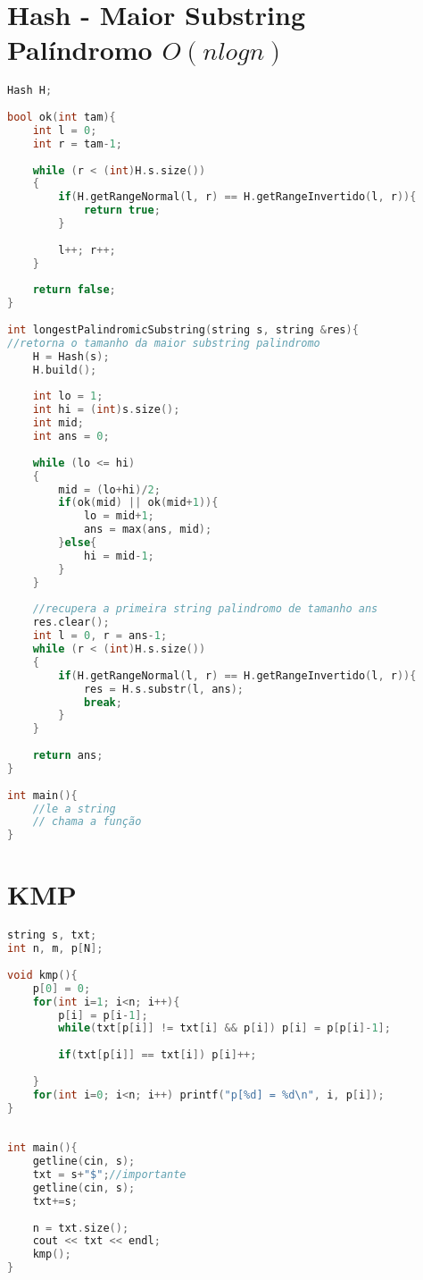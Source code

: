 \documentclass[12pt,a4paper,twoside]{report}
\begin{document}
\section{Hash - Maior Substring Palíndromo $O(nlogn)$}
\noindent\begin{lstlisting}[caption=Hash - Maior Substring Palíndromo (nlogn),language=C++]
Hash H;
 
bool ok(int tam){
    int l = 0;
    int r = tam-1;
     
    while (r < (int)H.s.size())
    {
        if(H.getRangeNormal(l, r) == H.getRangeInvertido(l, r)){
            return true;
        }
         
        l++; r++;
    }
     
    return false;
}
 
int longestPalindromicSubstring(string s, string &res){
//retorna o tamanho da maior substring palindromo
    H = Hash(s);
    H.build();
     
    int lo = 1;
    int hi = (int)s.size();
    int mid;
    int ans = 0;
     
    while (lo <= hi)
    {
        mid = (lo+hi)/2;
        if(ok(mid) || ok(mid+1)){
            lo = mid+1;
            ans = max(ans, mid);
        }else{
            hi = mid-1;
        }
    }
     
    //recupera a primeira string palindromo de tamanho ans
    res.clear();
    int l = 0, r = ans-1;
    while (r < (int)H.s.size())
    {
        if(H.getRangeNormal(l, r) == H.getRangeInvertido(l, r)){
            res = H.s.substr(l, ans);
            break;
        }
    }
     
    return ans;
}
 
int main(){
    //le a string
    // chama a função
}
\end{lstlisting}

\section{KMP}
\noindent\begin{lstlisting}[caption=KMP,language=C++]
string s, txt;
int n, m, p[N];
 
void kmp(){
    p[0] = 0;
    for(int i=1; i<n; i++){
        p[i] = p[i-1];
        while(txt[p[i]] != txt[i] && p[i]) p[i] = p[p[i]-1];
         
        if(txt[p[i]] == txt[i]) p[i]++;
         
    }
    for(int i=0; i<n; i++) printf("p[%d] = %d\n", i, p[i]);
}
 
 
int main(){
    getline(cin, s);
    txt = s+"$";//importante
    getline(cin, s);
    txt+=s;
     
    n = txt.size();
    cout << txt << endl;
    kmp();    
}
\end{lstlisting}
\end{document}
